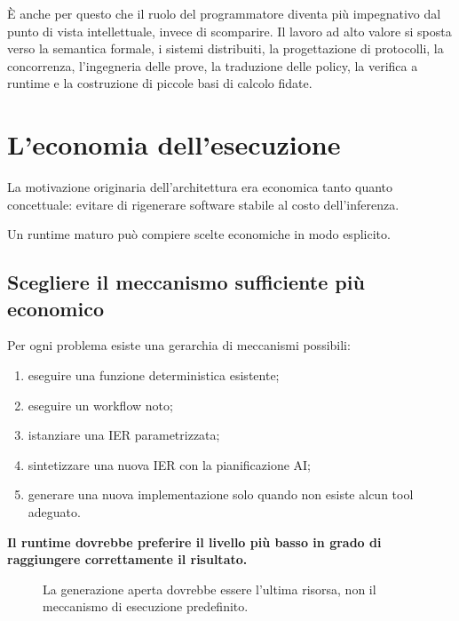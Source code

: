 \documentclass[10pt,oneside,openany]{book}
\begin{document}
È anche per questo che il ruolo del programmatore diventa più impegnativo dal punto di vista intellettuale, invece di scomparire. Il lavoro ad alto valore si sposta verso la semantica formale, i sistemi distribuiti, la progettazione di protocolli, la concorrenza, l'ingegneria delle prove, la traduzione delle policy, la verifica a runtime e la costruzione di piccole basi di calcolo fidate.

\chapter{L'economia dell'esecuzione}

La motivazione originaria dell'architettura era economica tanto quanto concettuale: evitare di rigenerare software stabile al costo dell'inferenza.

Un runtime maturo può compiere scelte economiche in modo esplicito.

\section{Scegliere il meccanismo sufficiente più economico}
Per ogni problema esiste una gerarchia di meccanismi possibili:

\begin{enumerate}
\item eseguire una funzione deterministica esistente;
\item eseguire un workflow noto;
\item istanziare una IER parametrizzata;
\item sintetizzare una nuova IER con la pianificazione AI;
\item generare una nuova implementazione solo quando non esiste alcun tool adeguato.
\end{enumerate}

\textbf{Il runtime dovrebbe preferire il livello più basso in grado di raggiungere correttamente il risultato.}

\begin{figure}[ht]
\centering
{}
\caption{La generazione aperta dovrebbe essere l'ultima risorsa, non il meccanismo di esecuzione predefinito.}
\end{figure}
\end{document}

